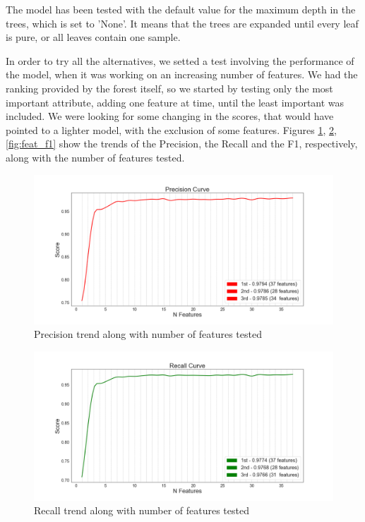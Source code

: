 The model has been tested with the default value for the maximum depth in the trees, which is set to 'None'. It means that the trees are expanded until every leaf is pure, or all leaves contain one sample.

In order to try all the alternatives, we setted a test involving the performance of the model, when it was working on an increasing number of features.
We had the ranking provided by the forest itself, so we started by testing only the most important attribute, adding one feature at time, until the least important was included.
We were looking for some changing in the scores, that would have pointed to a lighter model, with the exclusion of some features.
Figures \ref{fig:feat_prec}, \ref{fig:feat_rec}, \ref{fig:feat_f1} show the trends of the Precision, the Recall and the F1, respectively, along with the number of features tested.
 \begin{figure}[htp!]
 	\centering
 	\includegraphics[width=\columnwidth]{chapter5/figure/precision_along_features.png}
 	\caption{Precision trend along with number of features tested}
 	\label{fig:feat_prec}
 \end{figure}
\begin{figure}[htp!]
	\centering
	\includegraphics[width=\columnwidth]{chapter5/figure/recall_along_features.png}
	\caption{Recall trend along with number of features tested}
	\label{fig:feat_rec}
\end{figure}
